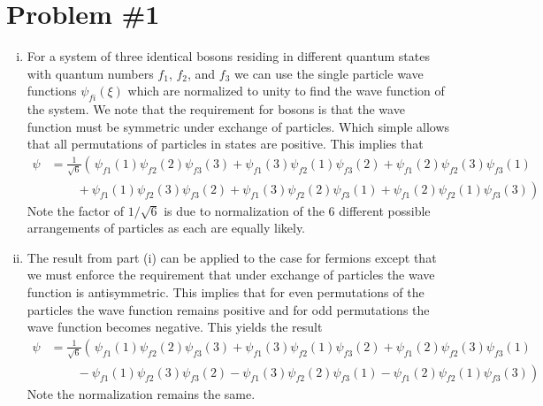 \documentclass[11pt]{article}
\numberwithin{equation}{section}
\begin{document}


\section{Problem \#1}
\begin{enumerate}[(i)]
\item For a system of three identical bosons residing in different quantum states with 
quantum numbers $f_1$, $f_2$, and $f_3$ we can use the single particle wave functions 
$\psi_{fi}(\xi)$ which are normalized to unity to find the wave function of the system. We 
note that the requirement for bosons is that the wave function must be symmetric under 
exchange of particles. Which simple allows that all permutations of particles in states are
positive. This implies that
\begin{align*}
\psi &= \frac{1}{\sqrt{6}}\left(\frac{}{}
\psi_{f1}(1)\psi_{f2}(2)\psi_{f3}(3)
+ \psi_{f1}(3)\psi_{f2}(1)\psi_{f3}(2)\right.
+ \psi_{f1}(2)\psi_{f2}(3)\psi_{f3}(1)\\
&\qquad \left.\frac{}{}+ \psi_{f1}(1)\psi_{f2}(3)\psi_{f3}(2)
+ \psi_{f1}(3)\psi_{f2}(2)\psi_{f3}(1)
+ \psi_{f1}(2)\psi_{f2}(1)\psi_{f3}(3)
\right)
\end{align*}
Note the factor of $1/\sqrt{6}$ is due to normalization of the 6 different possible arrangements
of particles as each are equally likely.

\item
The result from part (i) can be applied to the case for fermions except that we must enforce
the requirement that under exchange of particles the wave function is antisymmetric. This 
implies that for even permutations of the particles the wave function remains positive and 
for odd permutations the wave function becomes negative. This yields the result
\begin{align*}
\psi &= \frac{1}{\sqrt{6}}\left(\frac{}{}
\psi_{f1}(1)\psi_{f2}(2)\psi_{f3}(3)
+ \psi_{f1}(3)\psi_{f2}(1)\psi_{f3}(2)\right.
+ \psi_{f1}(2)\psi_{f2}(3)\psi_{f3}(1)\\
&\qquad \left.\frac{}{}- \psi_{f1}(1)\psi_{f2}(3)\psi_{f3}(2)
- \psi_{f1}(3)\psi_{f2}(2)\psi_{f3}(1)
- \psi_{f1}(2)\psi_{f2}(1)\psi_{f3}(3)
\right)
\end{align*}
Note the normalization remains the same.
\end{enumerate}
\end{document}
